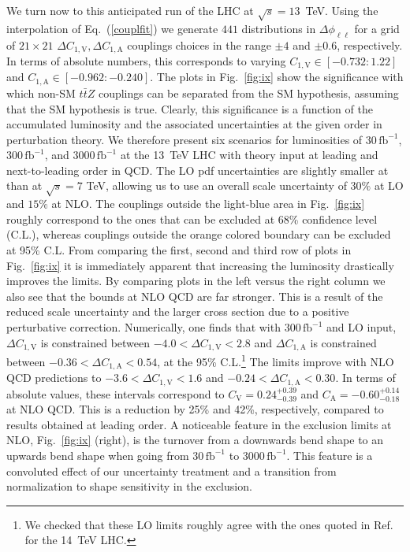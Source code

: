 \documentclass{JHEP3}
\def\ttbZ{t\bar{t}Z}
\def\invfb {\mathrm{fb}^{-1}}
\def\ConeA{C_{1,\mathrm{A}}}
\def\ConeV{C_{1,\mathrm{V}}}
\def\DConeA{\Delta C_{1,\mathrm{A}}}
\def\DConeV{\Delta C_{1,\mathrm{V}}}
\begin{document}
We turn now to this anticipated run of the LHC at $\sqrt{s}=13$~TeV.
Using the interpolation of Eq.~(\ref{couplfit}) we generate $441$ distributions in $\Delta \phi_{\ell\ell}$ for a grid of $21 \times 21$ $\DConeV,\DConeA$ couplings 
choices in the range $\pm 4$ and $\pm 0.6$, respectively. 
In terms of absolute numbers, this corresponds to varying $\ConeV \in [-0.732:1.22]$ and $\ConeA \in [-0.962:-0.240]$.
The plots in Fig.~\ref{fig:ix} show the significance with which non-SM $\ttbZ$ couplings can be separated from the SM hypothesis, assuming that the SM hypothesis is true.
Clearly, this significance is a function of the accumulated luminosity and the associated uncertainties at the given order in perturbation theory.
We therefore present six scenarios for luminosities of $30\, \invfb$, $300\, \invfb$, and $3000\, \invfb$ at the 13~TeV LHC with 
theory input at leading and next-to-leading order in QCD.
The LO pdf uncertainties are slightly smaller at than at $\sqrt{s}=7$ TeV, allowing us to use an overall scale uncertainty of $30\%$ at LO and $15\%$ at NLO.
The couplings outside the light-blue area in Fig.~\ref{fig:ix} roughly correspond to the ones that can be excluded at 68\% confidence level (C.L.),
whereas couplings outside the orange colored boundary can be excluded at 95\% C.L.
From comparing the first, second and third row of plots in Fig.~\ref{fig:ix} it is immediately apparent that 
increasing the luminosity drastically improves the limits. 
By comparing plots in the left versus the right column we also see that 
the bounds at NLO QCD are far stronger.
This is a result of the reduced scale uncertainty and the larger cross section due to a positive perturbative correction.
Numerically, one finds that with $300\, \invfb$ and LO input, $\DConeV$ is constrained between $-4.0 < \DConeV < 2.8$ and $\DConeA$ is constrained between $-0.36 < \DConeA < 0.54$, 
at the 95\% C.L.\footnote{We checked that these LO limits roughly agree with the ones quoted in Ref.~\cite{Baur:2004uw} for the 14~TeV LHC.}
The limits improve with NLO QCD predictions to $-3.6 < \DConeV < 1.6$  and $-0.24 < \DConeA < 0.30$.
In terms of absolute values, these intervals correspond to $C_\mathrm{V}=0.24^{+0.39}_{-0.39}$ and $C_\mathrm{A}=-0.60^{+0.14}_{-0.18}$ at NLO QCD.
This is a reduction by 25\% and 42\%, respectively, compared to results obtained at leading order.
A noticeable feature in the exclusion limits at NLO, Fig.~\ref{fig:ix} (right), is the turnover from a 
downwards bend shape to an upwards bend shape when going from $30\,\invfb$ to $3000\,\invfb$.
This feature is a convoluted effect of our uncertainty treatment and a transition from normalization to shape sensitivity in the exclusion.
\end{document}
